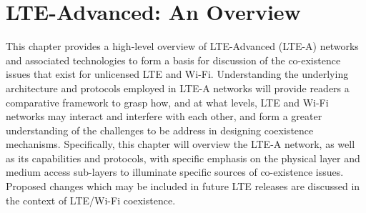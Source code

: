%
%
%

\chapter{LTE-Advanced: An Overview}
\label{overview-lte} %


This chapter provides a high-level overview of LTE-Advanced (LTE-A) networks and associated technologies to form a basis for discussion of the co-existence issues that exist for unlicensed LTE and Wi-Fi. Understanding the underlying architecture and protocols employed in LTE-A networks will provide readers a comparative framework to grasp how, and at what levels, LTE and Wi-Fi networks may interact and interfere with each other, and form a greater understanding of the challenges to be address in designing coexistence mechanisms. Specifically, this chapter will overview the LTE-A network, as well as its capabilities and protocols, with specific emphasis on the physical layer and medium access sub-layers to illuminate specific sources of co-existence issues. Proposed changes which may be included in future LTE releases are discussed in the context of LTE/Wi-Fi coexistence.


